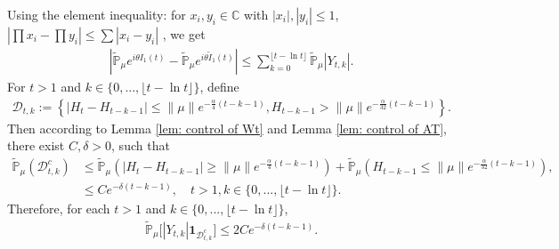 \documentclass[12pt,oneside,english]{amsart}
\theoremstyle{plain}
\theoremstyle{definition}
\numberwithin{equation}{section}
\begin{document}
    Using the element inequality: for $x_i,y_i \in \mathbb{C}$ with $|x_i|,|y_i|\leq 1$, $|\prod x_i-\prod y_i|\leq\sum |x_i-y_i|$ , we get
    \begin{align}\label{ineq: control of I1t}
        \left|\mathbb{\tilde{P}}_{\mu}e^{i\theta I_1(t)}-\mathbb{\tilde{P}}_{\mu}e^{i\theta\tilde{I}_1(t)}\right|\leq \sum_{k=0}^{\lfloor t-\ln t \rfloor}\mathbb{\tilde{P}}_{\mu}|Y_{t,k}|.
    \end{align}
    For $t>1$ and $k\in \{0,...,\lfloor t-\ln t \rfloor\}$, define
    \begin{align*}
        \mathcal{D}_{t,k}:=\left\{|H_t-H_{t-k-1}|\leq \|\mu\| e^{-\frac{\alpha}{4}(t-k-1)}, H_{t-k-1}>\|\mu\|e^{-\frac{\alpha}{32}(t-k-1)}\right\}.
    \end{align*}
    Then according to Lemma \ref{lem: control of Wt} and Lemma \ref{lem: control of AT}, there exist $C,\delta>0$, such that
    \begin{align*}
        \mathbb{\tilde{P}}_{\mu}(\mathcal{D}_{t,k}^c)&\leq \mathbb{\tilde{P}}_{\mu}(|H_t-H_{t-k-1}|\geq \|\mu\| e^{-\frac{\alpha}{4}(t-k-1)})+\mathbb{\tilde{P}}_{\mu}(H_{t-k-1}\leq \|\mu\|e^{-\frac{\alpha}{32}(t-k-1)}),\\
        &\leq C e^{-\delta(t-k-1)}, \quad t>1, k\in \{0,...,\lfloor t-\ln t \rfloor\}.
    \end{align*}
  Therefore, for each $t>1$ and $k\in \{0,...,\lfloor t-\ln t \rfloor\}$,
    \begin{align}
        \mathbb{\tilde{P}}_{\mu}\big[|Y_{t,k}|\mathbf{1}_{\mathcal{D}^c_{t,k}}\big]\leq 2 C e^{-\delta(t-k-1)}.\label{thm121}
    \end{align}
\end{document}

